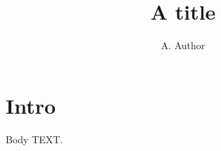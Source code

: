 \documentclass{elsarticle}
\begin{document}
\title{A title}
\author{A. Author}
\frontmatter
\maketitle
\section{Intro}
Body TEXT.
\end{document}
